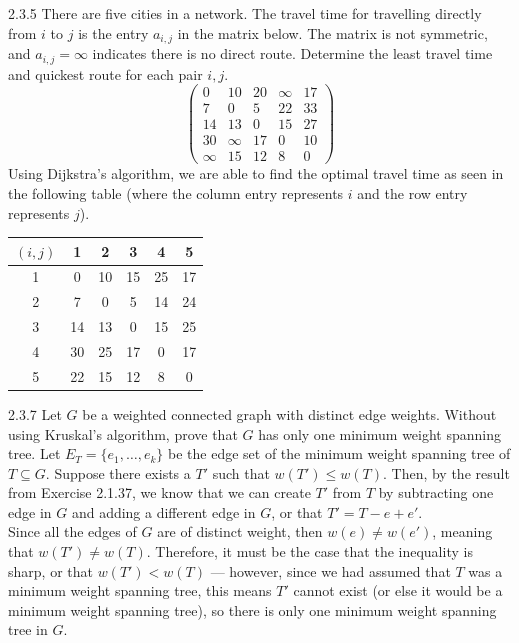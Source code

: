\documentclass[10pt]{extarticle}
\begin{document}
  \begin{problem}{2.3.5}
    There are five cities in a network. The travel time for travelling directly from $i$ to $j$ is the entry $a_{i,j}$ in the matrix below. The matrix is not symmetric, and $a_{i,j} = \infty$ indicates there is no direct route. Determine the least travel time and quickest route for each pair $i,j$.
    \[
      \begin{pmatrix}
        0 & 10 & 20 & \infty & 17 \\
        7 & 0 & 5 & 22 & 33 \\
        14 & 13 & 0 & 15 & 27 \\
        30 & \infty & 17 & 0 & 10 \\
        \infty & 15 & 12 & 8 & 0
      \end{pmatrix}
    \]
    \tcblower
    Using Dijkstra's algorithm, we are able to find the optimal travel time as seen in the following table (where the column entry represents $i$ and the row entry represents $j$).
    \begin{center}
    \renewcommand{\arraystretch}{1.5}
      \begin{tabular}{c|ccccc}
        $(i,j)$ & 1 & 2 & 3 & 4 & 5 \\
        \hline
        1 & 0 & 10 & 15 & 25 & 17 \\
        2 & 7 & 0 & 5 & 14 & 24 \\
        3 & 14 & 13 & 0 & 15 & 25 \\
        4 & 30 & 25 & 17 & 0 & 17 \\
        5 & 22 & 15 & 12 & 8 & 0
      \end{tabular}
    \end{center}
  \end{problem}
  \begin{problem}{2.3.7}
    Let $G$ be a weighted connected graph with distinct edge weights. Without using Kruskal's algorithm, prove that $G$ has only one minimum weight spanning tree.
    \tcblower
    Let $E_{T} = \{e_1,\dots,e_k\}$ be the edge set of the minimum weight spanning tree of $T\subseteq G$. Suppose there exists a $T'$ such that $w(T')\leq w(T)$. Then, by the result from Exercise 2.1.37, we know that we can create $T'$ from $T$ by subtracting one edge in $G$ and adding a different edge in $G$, or that $T' = T-e+e'$.\\

    Since all the edges of $G$ are of distinct weight, then $w(e) \neq w(e')$, meaning that $w(T') \neq w(T)$. Therefore, it must be the case that the inequality is sharp, or that $w(T') < w(T)$ --- however, since we had assumed that $T$ was a minimum weight spanning tree, this means $T'$ cannot exist (or else it would be a minimum weight spanning tree), so there is only one minimum weight spanning tree in $G$.
  \end{problem}
\end{document}
